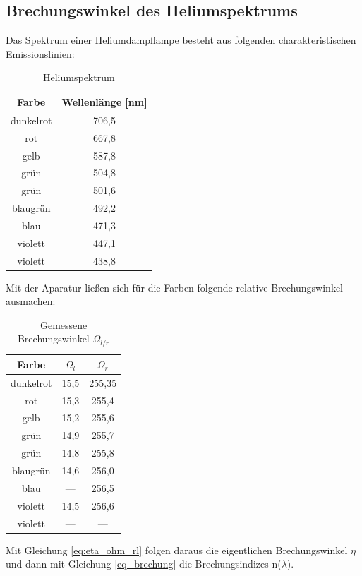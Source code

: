\subsection{Brechungswinkel des Heliumspektrums}
Das Spektrum einer Heliumdampflampe besteht aus folgenden charakteristischen Emissionslinien:
\begin{table}[H]
\begin{tabular}{|c|c|}
Farbe & Wellenlänge [nm]\\ \hline
dunkelrot	&706,5 \\ \hline
rot	&	667,8\\ \hline
gelb	&	587,8\\ \hline
grün	&	504,8\\ \hline
grün	&	501,6\\ \hline
blaugrün	&	492,2\\ \hline
blau	&	471,3\\ \hline
violett	&	447,1\\ \hline
violett	&	438,8\\ \hline
\end{tabular} 
\caption{Heliumspektrum}
\end{table}
Mit der Aparatur ließen sich für die Farben folgende relative Brechungswinkel ausmachen:
\begin{table}[H]
\begin{tabular}{|c|c|c|}
Farbe &		$\Omega_l$&	$\Omega_r$ \\ \hline
dunkelrot	&15,5		&255,35 \\ \hline
rot			&15,3		&255,4 	\\ \hline
gelb		&15,2		&255,6 	\\ \hline
grün		&14,9		&255,7 	\\ \hline
grün		&14,8		&255,8 	\\ \hline
blaugrün	&14,6		&256,0 	\\ \hline
blau		& ---		&256,5 	\\ \hline
violett		&14,5		&256,6 	\\ \hline
violett		& ---		& --- 	\\ \hline
\end{tabular} 
\caption{Gemessene Brechungswinkel $\Omega_{l/r}$}
\label{tab_messwerte}
\end{table}

Mit Gleichung \eqref{eq:eta_ohm_rl} folgen daraus die eigentlichen Brechungswinkel $\eta$ und dann mit Gleichung \eqref{eq_brechung} die Brechungsindizes n($\lambda$).

